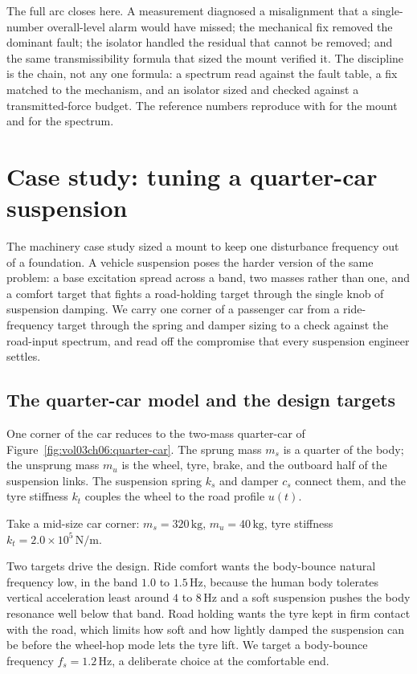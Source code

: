 The full arc closes here. A measurement diagnosed a misalignment that a
single-number overall-level alarm would have missed; the mechanical
fix removed the dominant fault; the isolator handled the residual that
cannot be removed; and the same transmissibility formula that sized the
mount verified it. The discipline is the chain, not any one formula: a
spectrum read against the fault table, a fix matched to the mechanism,
and an isolator sized and checked against a transmitted-force budget.
The reference numbers reproduce with 
for the mount and  for the spectrum.

\section{Case study: tuning a quarter-car suspension}

The machinery case study sized a mount to keep one disturbance
frequency out of a foundation. A vehicle suspension poses the harder
version of the same problem: a base excitation spread across a band, two
masses rather than one, and a comfort target that fights a road-holding
target through the single knob of suspension damping. We carry one
corner of a passenger car from a ride-frequency target through the
spring and damper sizing to a check against the road-input spectrum, and
read off the compromise that every suspension engineer settles.

\subsection{The quarter-car model and the design targets}

One corner of the car reduces to the two-mass quarter-car of
Figure~\ref{fig:vol03ch06:quarter-car}. The sprung mass $m_s$ is a
quarter of the body; the unsprung mass $m_u$ is the wheel, tyre, brake,
and the outboard half of the suspension links. The suspension spring
$k_s$ and damper $c_s$ connect them, and the tyre stiffness $k_t$
couples the wheel to the road profile $u(t)$.



Take a mid-size car
corner: $m_s = 320\,\si{\kilogram}$, $m_u = 40\,\si{\kilogram}$, tyre
stiffness $k_t = 2.0\times 10^5\,\si{\newton\per\meter}$.

Two targets drive the design. Ride comfort wants the body-bounce
natural frequency low, in the band $1.0$ to $1.5\,\si{\hertz}$, because
the human body tolerates vertical acceleration least around $4$ to
$8\,\si{\hertz}$ and a soft suspension pushes the body resonance well
below that band. Road holding wants the tyre kept in firm contact with
the road, which limits how soft and how lightly damped the suspension
can be before the wheel-hop mode lets the tyre lift. We target a
body-bounce frequency $f_s = 1.2\,\si{\hertz}$, a deliberate choice at
the comfortable end.

